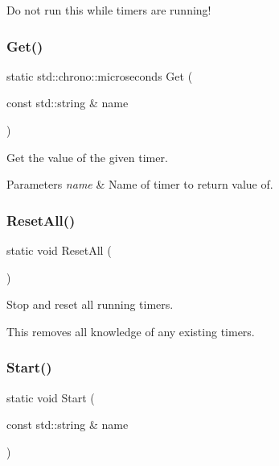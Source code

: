 Do not run this while timers are running! \mbox{\label{classmlpack_1_1Timer_a12540cc60abafd8b9c2a796a9ba2ee16}} 
\subsubsection{Get()}
{\footnotesize\ttfamily static std\+::chrono\+::microseconds Get (\begin{DoxyParamCaption}\item[{const std\+::string \&}]{name }\end{DoxyParamCaption})\hspace{0.3cm}{\ttfamily [static]}}



Get the value of the given timer. 


\begin{DoxyParams}{Parameters}
{\em name} & Name of timer to return value of. \\
\hline
\end{DoxyParams}
\mbox{\label{classmlpack_1_1Timer_a6335c4606497b8c63b2280b647e0dda3}} 
\subsubsection{Reset\+All()}
{\footnotesize\ttfamily static void Reset\+All (\begin{DoxyParamCaption}{ }\end{DoxyParamCaption})\hspace{0.3cm}{\ttfamily [static]}}



Stop and reset all running timers. 

This removes all knowledge of any existing timers. \mbox{\label{classmlpack_1_1Timer_aa052af5e185f178dcfd540b95d2b1d11}} 
\subsubsection{Start()}
{\footnotesize\ttfamily static void Start (\begin{DoxyParamCaption}\item[{const std\+::string \&}]{name }\end{DoxyParamCaption})\hspace{0.3cm}{\ttfamily [static]}}



